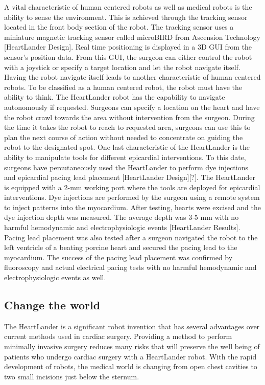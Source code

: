 \documentclass[11pt,conference]{IEEEtran}
\begin{document}
\newline
\indent A vital characteristic of human centered robots as well as medical robots is the ability to sense the environment. This is achieved through the tracking sensor located in the front body section of the robot. The tracking sensor uses a miniature magnetic tracking sensor called microBIRD from Ascension Technology [HeartLander Design]. Real time positioning is displayed in a 3D GUI from the sensor's position data. From this GUI, the surgeon can either control the robot with a joystick or specify a target location and let the robot navigate itself. Having the robot navigate itself leads to another characteristic of human centered robots.
\newline
\indent To be classified as a human centered robot, the robot must have the ability to think. The HeartLander robot has the capability to navigate autonomously if requested. Surgeons can specify a location on the heart and have the robot crawl towards the area without intervention from the surgeon. During the time it takes the robot to reach to requested area, surgeons can use this to plan the next course of action without needed to concentrate on guiding the robot to the designated spot.
\newline
\indent One last characteristic of the HeartLander is the ability to manipulate tools for different epicardial interventions. To this date, surgeons have percutaneously used the HeartLander to perform dye injections and epicardial pacing lead placement [HeartLander Design][?]. The HeartLander is equipped with a 2-mm working port where the tools are deployed for epicardial interventions. Dye injections are performed by the surgeon using a remote system to inject patterns into the myocardium. After testing, hearts were excised and the dye injection depth was measured. The average depth was 3-5 mm with no harmful hemodynamic and electrophysiologic events [HeartLander Results]. Pacing lead placement was also tested after a surgeon navigated the robot to the left ventricle of a beating porcine heart and secured the pacing lead to the myocardium. The success of the pacing lead placement was confirmed by fluoroscopy and actual electrical pacing tests with no harmful hemodynamic and electrophysiologic events as well.
\subsection { Change the world }
\indent The HeartLander is a significant robot invention that has several advantages over current methods used in cardiac surgery. Providing a method to perform minimally invasive surgery reduces many risks that will preserve the well being of patients who undergo cardiac surgery with a HeartLander robot. With the rapid development of robots, the medical world is changing from open chest cavities to two small incisions just below the sternum. 

\end{document}
